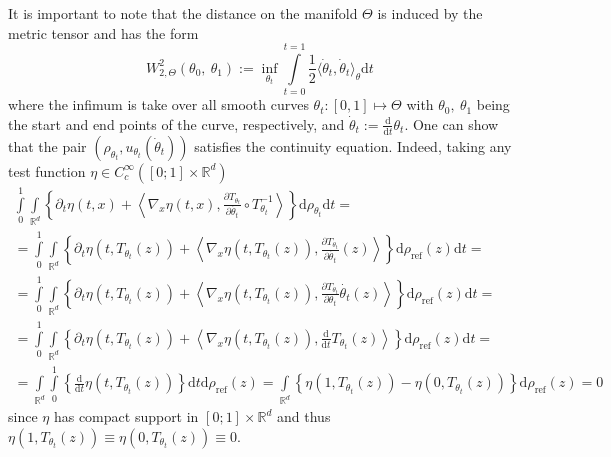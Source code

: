 \documentclass{article} %
\numberwithin{equation}{subsection}
\numberwithin{theorem}{section}
\newcommand{\dd}{\mathrm{d}}
\newcommand{\rhoref}{{\rho_{\text{ref}}}}
\begin{document}
    It is important to note that the distance on the manifold $\Theta$ is induced by the metric tensor and has the form
    \begin{equation}\label{eq:distance_on_submanifold}
        W^2_{2,\Theta}(\theta_0,\ \theta_1) 
            := {\inf}_{\theta_t} \int\limits_{t = 0}^{t = 1} \frac{1}{2} \langle \dot\theta_t, \dot\theta_t \rangle_{\theta} \dd t
    \end{equation}
    where the infimum is take over all smooth curves $\theta_t: [0, 1] \mapsto \Theta $ with $\theta_0,\ \theta_1$ being the start and end points of the curve, respectively,
    and $\dot \theta_t := \frac{\dd}{\dd t}\theta_t$.
    One can show that the pair $(\rho_{\theta_t}, {u}_{\theta_t}(\dot\theta_t))$ satisfies the continuity equation.
    Indeed, taking any test function $\eta \in C^\infty_{c}\left( [0; 1] \times \mathbb{R}^d \right)$
    \begin{multline*}
        \int\limits_0^1 \int\limits_{\mathbb{R}^d}\left\{ 
            \partial_t \eta(t, x) + \left\langle\nabla_x\eta(t, x), \frac{\partial T_{\theta_t}}{\partial \dot{\theta_t} }\circ T^{-1}_{\theta_t}\right\rangle  
        \right\}\dd\rho_{\theta_t}\dd t = \\ =
        \int\limits_0^1 \int\limits_{\mathbb{R}^d}\left\{ 
            \partial_t \eta(t, T_{\theta_t}(z)) + \left\langle\nabla_x\eta(t, T_{\theta_t}(z)), \frac{\partial T_{\theta_t}}{\partial \dot{\theta_t} }(z)\right\rangle
        \right\}\dd \rhoref(z)\dd t = \\ =
        \int\limits_0^1 \int\limits_{\mathbb{R}^d}\left\{ 
            \partial_t \eta(t, T_{\theta_t}(z)) + \left\langle\nabla_x\eta(t, T_{\theta_t}(z)), \frac{\partial T_{\theta_t}}{\partial {\theta_t} }\dot{\theta_t}(z)\right\rangle
        \right\}\dd \rhoref(z)\dd t = \\ =
        \int\limits_0^1 \int\limits_{\mathbb{R}^d}\left\{ 
            \partial_t \eta(t, T_{\theta_t}(z)) + \left\langle\nabla_x\eta(t, T_{\theta_t}(z)), \frac{\dd}{\dd t} T_{\theta_t}(z)\right\rangle
        \right\}\dd \rhoref(z)\dd t = \\ =
        \int\limits_{\mathbb{R}^d} \int\limits_0^1 \left\{ \frac{\dd}{\dd t} \eta(t, T_{\theta_t}(z))\right\} \dd t \dd \rhoref(z) =
        \int\limits_{\mathbb{R}^d} \left\{\eta(1, T_{\theta_t}(z)) - \eta(0, T_{\theta_t}(z))\right\}\dd \rhoref(z) = 0
    \end{multline*}
    since $\eta$ has compact support in  $[0; 1] \times \mathbb{R}^d $ and thus $\eta(1, T_{\theta_t}(z)) \equiv \eta(0, T_{\theta_t}(z)) \equiv 0$.
\end{document}

